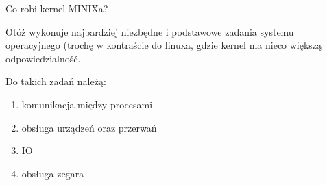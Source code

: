 Co robi kernel MINIXa?

Otóż wykonuje najbardziej niezbędne i podstawowe zadania systemu operacyjnego (trochę w kontraście do linuxa, gdzie kernel ma nieco większą odpowiedzialność.

Do takich zadań należą:
\begin{enumerate}
    \item komunikacja między procesami
    \item obsługa urządzeń oraz przerwań
    \item IO
    \item obsługa zegara
\end{enumerate}